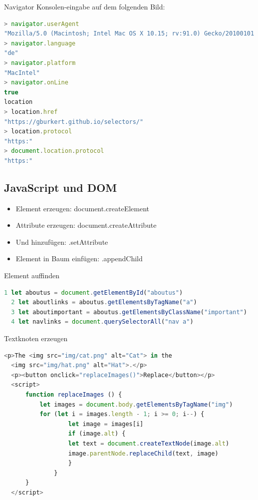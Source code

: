 \begin{definition}{Navigator}
Konsolen-eingabe auf dem folgenden Bild:
\end{definition}

\begin{lstlisting}[language=JavaScript, style=basesmol]
> navigator.userAgent
"Mozilla/5.0 (Macintosh; Intel Mac OS X 10.15; rv:91.0) Gecko/20100101 Firefox/91.0"
> navigator.language
"de"
> navigator.platform
"MacIntel"
> navigator.onLine
true
location
> location.href
"https://gburkert.github.io/selectors/"
> location.protocol
"https:"
> document.location.protocol
"https:"
\end{lstlisting}

\subsection{JavaScript und DOM}

\begin{itemize}
    \item Element erzeugen: document.createElement
    \item Attribute erzeugen: document.createAttribute
    \item Und hinzufügen: .setAttribute
    \item Element in Baum einfügen: .appendChild
  \end{itemize}
  
  Element auffinden
  
  \begin{lstlisting}[language=JavaScript, style=basesmol]
  1 let aboutus = document.getElementById("aboutus")
  2 let aboutlinks = aboutus.getElementsByTagName("a")
  3 let aboutimportant = aboutus.getElementsByClassName("important")
  4 let navlinks = document.querySelectorAll("nav a")
  \end{lstlisting}
  
  \begin{definition}{Textknoten erzeugen}
  \begin{lstlisting}[language=JavaScript, style=basesmol]
  <p>The <img src="img/cat.png" alt="Cat"> in the
  <img src="img/hat.png" alt="Hat">.</p>
  <p><button onclick="replaceImages()">Replace</button></p>
  <script>
      function replaceImages () {
          let images = document.body.getElementsByTagName("img")
          for (let i = images.length - 1; i >= 0; i--) {
                  let image = images[i]
                  if (image.alt) {
                  let text = document.createTextNode(image.alt)
                  image.parentNode.replaceChild(text, image)
                  }
              }
      }
  </script>
  \end{lstlisting}
\end{definition}
  
